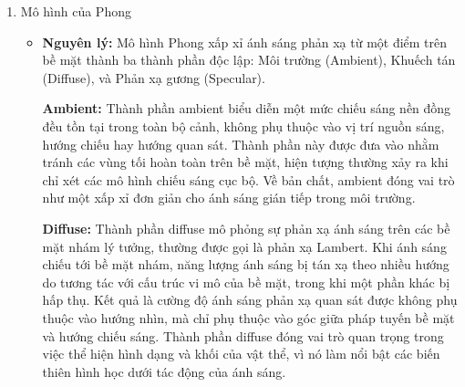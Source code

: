 \begin{enumerate}
\begin{itemize}
		Tại mỗi pixel trên dòng quét nằm bên trong đa giác, cường độ màu được nội suy từ màu của các giao điểm trên cạnh.\\
		\begin{gather*}
			I_j = t * I_1 + (1 - t) * I_2 \quad t \in [0; 1]
		\end{gather*}
		Với:\\
		- $I_j$ là cường độ ánh sáng tại một điểm nằm trên dòng quét.\\
		- $I_1, I_2$ là cường độ ánh sáng tại hai giao điểm giữa dòng quét và các cạnh đa giác.
		
		\item \textbf{Đóng góp:} Đây là một bước đột phá lớn, cho phép các bề mặt đa giác trông mượt mà với chi phí tính toán tăng thêm không đáng kể. Mô hình Gouraud đã giải quyết hiện tượng thay đổi màu sắc đột ngột.
		
		\item \textbf{Hạn chế:} Vì chỉ nội suy màu, kết xuất Gouraud không thể tái tạo chính xác các hiệu ứng chiếu sáng có tần số cao, chẳng hạn như các đốm sáng phản xạ gương (specular highlights) nhỏ. Nếu một đốm sáng nằm hoàn toàn bên trong một đa giác, nó sẽ bị "nhòe" đi hoặc biến mất. Hiện tượng Mach bands cũng có thể xuất hiện.
	\end{itemize}
	
	\item Mô hình của Phong
	\begin{itemize}
		\item \textbf{Nguyên lý:} Mô hình Phong xấp xỉ ánh sáng phản xạ từ một điểm trên bề mặt thành ba thành phần độc lập: Môi trường (Ambient), Khuếch tán (Diffuse), và Phản xạ gương (Specular)\cite{phong2}.
		
		\textbf{Ambient:}
		Thành phần ambient biểu diễn một mức chiếu sáng nền đồng đều tồn tại trong toàn bộ cảnh, không phụ thuộc vào vị trí nguồn sáng, hướng chiếu hay hướng quan sát. Thành phần này được đưa vào nhằm tránh các vùng tối hoàn toàn trên bề mặt, hiện tượng thường xảy ra khi chỉ xét các mô hình chiếu sáng cục bộ. Về bản chất, ambient đóng vai trò như một xấp xỉ đơn giản cho ánh sáng gián tiếp trong môi trường.
		
		\textbf{Diffuse:}
		Thành phần diffuse mô phỏng sự phản xạ ánh sáng trên các bề mặt nhám lý tưởng, thường được gọi là phản xạ Lambert. Khi ánh sáng chiếu tới bề mặt nhám, năng lượng ánh sáng bị tán xạ theo nhiều hướng do tương tác với cấu trúc vi mô của bề mặt, trong khi một phần khác bị hấp thụ. Kết quả là cường độ ánh sáng phản xạ quan sát được không phụ thuộc vào hướng nhìn, mà chỉ phụ thuộc vào góc giữa pháp tuyến bề mặt và hướng chiếu sáng. Thành phần diffuse đóng vai trò quan trọng trong việc thể hiện hình dạng và khối của vật thể, vì nó làm nổi bật các biến thiên hình học dưới tác động của ánh sáng.
		

\end{itemize}
\end{enumerate}
